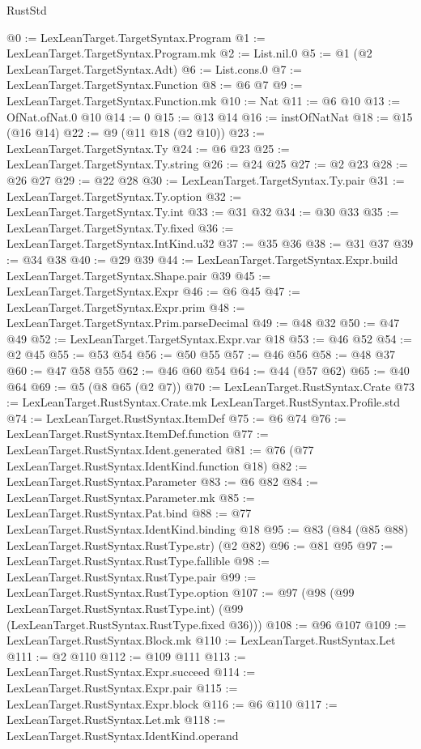 \begin{lexlean}{RustStd}
\begin{coremodule}
{\begin{coremodule}
{{{{{@0 := LexLeanTarget.TargetSyntax.Program
@1 := LexLeanTarget.TargetSyntax.Program.mk
@2 := List.nil.{0}
@5 := @1 (@2 LexLeanTarget.TargetSyntax.Adt)
@6 := List.cons.{0}
@7 := LexLeanTarget.TargetSyntax.Function
@8 := @6 @7
@9 := LexLeanTarget.TargetSyntax.Function.mk
@10 := Nat
@11 := @6 @10
@13 := OfNat.ofNat.{0} @10
@14 := 0
@15 := @13 @14
@16 := instOfNatNat
@18 := @15 (@16 @14)
@22 := @9 (@11 @18 (@2 @10))
@23 := LexLeanTarget.TargetSyntax.Ty
@24 := @6 @23
@25 := LexLeanTarget.TargetSyntax.Ty.string
@26 := @24 @25
@27 := @2 @23
@28 := @26 @27
@29 := @22 @28
@30 := LexLeanTarget.TargetSyntax.Ty.pair
@31 := LexLeanTarget.TargetSyntax.Ty.option
@32 := LexLeanTarget.TargetSyntax.Ty.int
@33 := @31 @32
@34 := @30 @33
@35 := LexLeanTarget.TargetSyntax.Ty.fixed
@36 := LexLeanTarget.TargetSyntax.IntKind.u32
@37 := @35 @36
@38 := @31 @37
@39 := @34 @38
@40 := @29 @39
@44 := LexLeanTarget.TargetSyntax.Expr.build LexLeanTarget.TargetSyntax.Shape.pair @39
@45 := LexLeanTarget.TargetSyntax.Expr
@46 := @6 @45
@47 := LexLeanTarget.TargetSyntax.Expr.prim
@48 := LexLeanTarget.TargetSyntax.Prim.parseDecimal
@49 := @48 @32
@50 := @47 @49
@52 := LexLeanTarget.TargetSyntax.Expr.var @18
@53 := @46 @52
@54 := @2 @45
@55 := @53 @54
@56 := @50 @55
@57 := @46 @56
@58 := @48 @37
@60 := @47 @58 @55
@62 := @46 @60 @54
@64 := @44 (@57 @62)
@65 := @40 @64
@69 := @5 (@8 @65 (@2 @7))
@70 := LexLeanTarget.RustSyntax.Crate
@73 := LexLeanTarget.RustSyntax.Crate.mk LexLeanTarget.RustSyntax.Profile.std
@74 := LexLeanTarget.RustSyntax.ItemDef
@75 := @6 @74
@76 := LexLeanTarget.RustSyntax.ItemDef.function
@77 := LexLeanTarget.RustSyntax.Ident.generated
@81 := @76 (@77 LexLeanTarget.RustSyntax.IdentKind.function @18)
@82 := LexLeanTarget.RustSyntax.Parameter
@83 := @6 @82
@84 := LexLeanTarget.RustSyntax.Parameter.mk
@85 := LexLeanTarget.RustSyntax.Pat.bind
@88 := @77 LexLeanTarget.RustSyntax.IdentKind.binding @18
@95 := @83 (@84 (@85 @88) LexLeanTarget.RustSyntax.RustType.str) (@2 @82)
@96 := @81 @95
@97 := LexLeanTarget.RustSyntax.RustType.fallible
@98 := LexLeanTarget.RustSyntax.RustType.pair
@99 := LexLeanTarget.RustSyntax.RustType.option
@107 := @97
    (@98
      (@99 LexLeanTarget.RustSyntax.RustType.int)
      (@99 (LexLeanTarget.RustSyntax.RustType.fixed @36)))
@108 := @96 @107
@109 := LexLeanTarget.RustSyntax.Block.mk
@110 := LexLeanTarget.RustSyntax.Let
@111 := @2 @110
@112 := @109 @111
@113 := LexLeanTarget.RustSyntax.Expr.succeed
@114 := LexLeanTarget.RustSyntax.Expr.pair
@115 := LexLeanTarget.RustSyntax.Expr.block
@116 := @6 @110
@117 := LexLeanTarget.RustSyntax.Let.mk
@118 := LexLeanTarget.RustSyntax.IdentKind.operand
}}}}}
\end{coremodule}}
\end{coremodule}
\end{lexlean}
